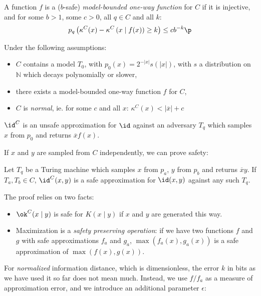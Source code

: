 \renewcommand*{\thefootnote}{\arabic{footnote}}
 
\begin{definition}\footnotemark
A function $f$ is a ($b$-safe) \emph{model-bounded one-way function} for $C$ if it is injective, and for some $b > 1$, some $c > 0$, all $q \in C$ and all $k$: 
\begin{align*}
p_q\left (\kappa^C(x) - \kappa^C\left(x\mid f(x)\right ) \geq k\right ) \leq cb^{-k} \p
\end{align*}
\label{definition:one-way}
\end{definition}

\renewcommand*{\thefootnote}{\fnsymbol{footnote}}

\begin{theorem}\footnotemark[2]
\label{theorem:unsafe-id}
Under the following assumptions:
\begin{itemize}
\item $C$ contains a model $T_0$, with $p_0(x) = 2^{-|x|}s(|x|)$, with $s$ a distribution on $\mathbb N$ which decays polynomially or slower,
\item there exists a model-bounded one-way function $f$ for $C$,
\item $C$ is \emph{normal}, ie. for some $c$ and all $x$: $\kappa^C(x) <  |\overline{x}| + c$
\end{itemize}
$\id^C$ is an unsafe approximation for $\id$ against an adversary $T_q$ which samples $x$ from $p_0$ and returns $\overline{x}f(x)$.
\end{theorem}
If $x$ and $y$ are sampled from $C$ independently, we can prove safety:

\begin{theorem}\footnotemark[2]
Let $T_q$ be a Turing machine which samples $x$ from $p_a$, $y$ from $p_b$ and returns $\overline{x}y$. If $T_a, T_b \in C$, $\id^C(x, y)$ is a safe approximation for $\id(x, y)$ against any such $T_q$.
\label{theorem:safe-id}    
\end{theorem}
The proof relies on two facts:
\begin{itemize}
  \item $\ok^C(x\mid y)$ is safe for $K(x\mid y)$ if $x$ and $y$ are generated this way.
  \item  Maximization is a \emph{safety preserving operation}: if we have two functions $f$ and $g$ with safe approximations $f_a$ and $g_a$, $\max(f_a(x), g_a(x))$ is a safe approximation of $\max(f(x), g(x))$.
\end{itemize} 
For \emph{normalized} information distance, which is dimensionless, the error $k$ in bits as we have used it so far does not mean much. Instead, we use  $f/f_a$ as a measure of approximation error, and we introduce an additional parameter $\epsilon$:


